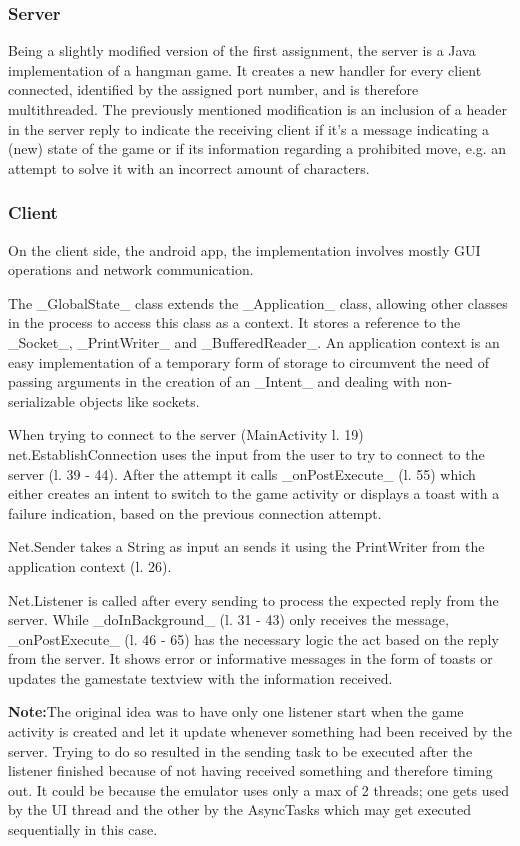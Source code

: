 \documentclass[a4paper]{scrartcl}
\begin{document}
\subsubsection{Server}
Being a slightly modified version of the first assignment, the server is a Java implementation of a hangman game.
It creates a new handler for every client connected, identified by the assigned port number, and is therefore multithreaded.
The previously mentioned modification is an inclusion of a header in the server reply to indicate the receiving client if it's a message indicating a (new) state of the game or if its information regarding a prohibited move, e.g. an attempt to solve it with an incorrect amount of characters.

\subsubsection{Client}
On the client side, the android app, the implementation involves mostly GUI operations and network communication.

The _GlobalState_ class extends the _Application_ class, allowing other classes in the process to access this class as a context.
It stores a reference to the _Socket_, _PrintWriter_ and _BufferedReader_. 
An application context is an easy implementation of a temporary form of storage to circumvent the need of passing arguments in the creation of an _Intent_ and dealing with non-serializable objects like sockets.


When trying to connect to the server (MainActivity l. 19) net.EstablishConnection uses the input from the user to try to connect to the server (l. 39 - 44).
After the attempt it calls _onPostExecute_ (l. 55) which either creates an intent to switch to the game activity or displays a toast with a failure indication, based on the previous connection attempt.

Net.Sender takes a String as input an sends it using the PrintWriter from the application context (l. 26).

Net.Listener is called after every sending to process the expected reply from the server.
While _doInBackground_  (l. 31 - 43) only receives the message, _onPostExecute_ (l. 46 - 65) has the necessary logic the act based on the reply from the server.
It shows error or informative messages in the form of toasts or updates the gamestate textview with the information received.

\textbf{Note:}The original idea was to have only one listener start when the game activity is created and let it update whenever something had been received by the server. Trying to do so resulted in the sending task to be executed after the listener finished because of not having received something and therefore timing out. It could be because the emulator uses only a max of 2 threads; one gets used by the UI thread and the other by the AsyncTasks which may get executed sequentially in this case.
\end{document}
